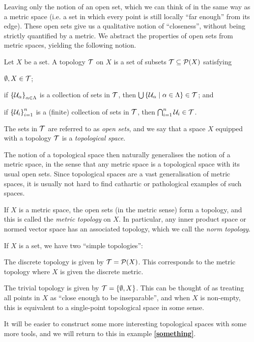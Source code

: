 \documentclass[11pt]{article}
\begin{document}
Leaving only the notion of an open set, which we can think of in the same way as a metric space (i.e. a set in which every point is still locally ``far enough'' from its edge). These open sets give us a qualitative notion of ``closeness'', without being strictly quantified by a metric. We abstract the properties of open sets from metric spaces, yielding the following notion.
\begin{definition}
    Let $X$ be a set. A topology $\mathcal{T}$ on $X$ is a set of subsets $\mathcal{T} \subseteq \mathcal{P}(X)$ satisfying
    \begin{enum}
        \item $\emptyset, X \in \mathcal{T}$;
        \item if $\left\{  \mathcal{U}_\alpha  \right\}_{\alpha \in \Lambda}$ is a collection of sets in $\mathcal{T}$, then $\bigcup\left\{  \mathcal{U}_\alpha \mid \alpha \in \Lambda  \right\} \in \mathcal{T}$; and
        \item if $\left\{  \mathcal{U}_i  \right\}_{i = 1}^n$ is a (finite) collection of sets in $\mathcal{T}$, then $\bigcap_{i = 1}^n \mathcal{U}_i \in \mathcal{T}$.
    \end{enum}
    The sets in $\mathcal{T}$ are referred to as \emph{open sets}, and we say that a space $X$ equipped with a topology $\mathcal{T}$ is a \emph{topological space}.
\end{definition}
The notion of a topological space then naturally generalises the notion of a metric space, in the sense that any metric space is a topological space with its usual open sets. Since topological spaces are a vast generalisation of metric spaces, it is usually not hard to find cathartic or pathological examples of such spaces. 
\begin{example}
    \begin{enum2}
        \item If $X$ is a metric space, the open sets (in the metric sense) form a topology, and this is called the \emph{metric topology} on $X$. In particular, any inner product space or normed vector space has an associated topology, which we call the \emph{norm topology}.
        \item If $X$ is a set, we have two ``simple topologies'':
        \begin{enum2}
            \item The discrete topology is given by $\mathcal{T} = \mathcal{P}(X)$. This corresponds to the metric topology where $X$ is given the discrete metric.
            \item The trivial topology is given by $\mathcal{T} = \left\{  \emptyset, X  \right\}$. This can be thought of as treating all points in $X$ as ``close enough to be inseparable'', and when $X$ is non-empty, this is equivalent to a single-point topological space in some sense.
        \end{enum2} 
    \end{enum2}
\end{example}
It will be easier to construct some more interesting topological spaces with some more tools, and we will return to this in example \textbf{\ref{something}}.
\end{document}
